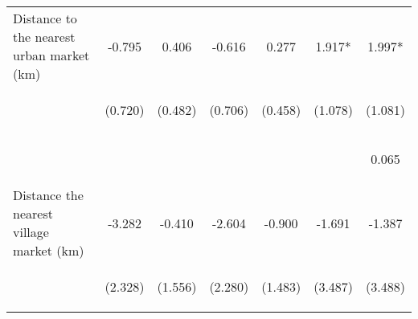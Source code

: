 \begin{center}
\begin{tabular}{lcccccc}
Distance to the nearest urban market (km) & -0.795 & 0.406 & -0.616 & 0.277 & 1.917* & 1.997* \\
 & \begin{footnotesize}(0.720)\end{footnotesize} & \begin{footnotesize}(0.482)\end{footnotesize} & \begin{footnotesize}(0.706)\end{footnotesize} & \begin{footnotesize}(0.458)\end{footnotesize} & \begin{footnotesize}(1.078)\end{footnotesize} & \begin{footnotesize}(1.081)\end{footnotesize} \\
\vspace{4pt} & \begin{footnotesize}[0.270]\end{footnotesize} & \begin{footnotesize}[0.400]\end{footnotesize} & \begin{footnotesize}[0.383]\end{footnotesize} & \begin{footnotesize}[0.546]\end{footnotesize} & \begin{footnotesize}[0.075]\end{footnotesize} & \begin{footnotesize}0.065\end{footnotesize} \\
Distance the nearest village market (km) & -3.282 & -0.410 & -2.604 & -0.900 & -1.691 & -1.387 \\
 & \begin{footnotesize}(2.328)\end{footnotesize} & \begin{footnotesize}(1.556)\end{footnotesize} & \begin{footnotesize}(2.280)\end{footnotesize} & \begin{footnotesize}(1.483)\end{footnotesize} & \begin{footnotesize}(3.487)\end{footnotesize} & \begin{footnotesize}(3.488)\end{footnotesize} \\

\end{tabular}
\end{center}
